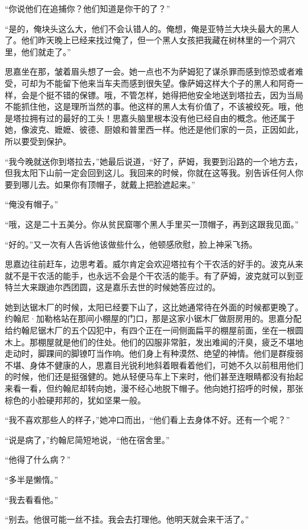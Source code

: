 \par “你说他们在追捕你？他们知道是你干的了？”
\par “是的，俺块头这么大，他们不会认错人的。俺想，俺是亚特兰大块头最大的黑人了。他们昨天晚上已经来找过俺了，但一个黑人女孩把我藏在树林里的一个洞穴里，他们就走了。”
\par 思嘉坐在那，皱着眉头想了一会。她一点也不为萨姆犯了谋杀罪而感到惊恐或者难受，可却为不能留下他来当车夫而感到很失望。像萨姆这样大个子的黑人和阿奇一样，会是个挺不错的保镖。哦，不管怎样，她得把他安全地送到塔拉去，因为当局不能抓住他，这是理所当然的事。他这样的黑人太有价值了，不该被绞死。哦，他是塔拉拥有过的最好的工头！思嘉头脑里根本没有他已经自由的概念。他还属于她，像波克、嬷嬷、彼德、厨娘和普里西一样。他还是他们家的一员，正因如此，所以要受到保护。
\par “我今晚就送你到塔拉去，”她最后说道，“好了，萨姆，我要到沿路的一个地方去，但我太阳下山前一定会回到这儿。我回来的时候，你就在这等我。别告诉任何人你要到哪儿去。如果你有顶帽子，就戴上把脸遮起来。”
\par “俺没有帽子。”
\par “哦，这是二十五美分。你从贫民窟哪个黑人手里买一顶帽子，再到这跟我见面。”
\par “好的。”又一次有人告诉他该做些什么，他顿感欣慰，脸上神采飞扬。
\par 思嘉边往前赶车，边思考着。威尔肯定会欢迎塔拉有个干农活的好手的。波克从来就不是干农活的能手，也永远不会是个干农活的能手。有了萨姆，波克就可以到亚特兰大来跟迪尔西团圆，这是嘉乐去世的时候她答应过的。
\par 她到达锯木厂的时候，太阳已经要下山了，这比她通常待在外面的时候都更晚了。约翰尼·加勒格站在那间小棚屋的门口，那是这家小锯木厂做厨房用的。思嘉分配给约翰尼锯木厂的五个囚犯中，有四个正在一间侧面扁平的棚屋前面，坐在一根圆木上。那棚屋就是他们的住处。他们的囚服非常脏，发出难闻的汗臭，疲乏不堪地走动时，脚踝间的脚镣叮当作响。他们身上有种漠然、绝望的神情。他们是群瘦弱不堪、身体不健康的人，思嘉目光锐利地斜着眼看着他们，可她不久以前租用他们的时候，他们还是挺强健的。她从轻便马车上下来时，他们甚至连眼睛都没有抬起来看一看，但约翰尼却转向她，漫不经心地脱下帽子。他向她打招呼的时候，那张棕色的小脸硬邦邦的，犹如坚果一般。
\par “我不喜欢那些人的样子，”她冲口而出，“他们看上去身体不好。还有一个呢？”
\par “说是病了，”约翰尼简短地说，“他在宿舍里。”
\par “他得了什么病？”
\par “多半是懒惰。”
\par “我去看看他。”
\par “别去。他很可能一丝不挂。我会去打理他。他明天就会来干活了。”

